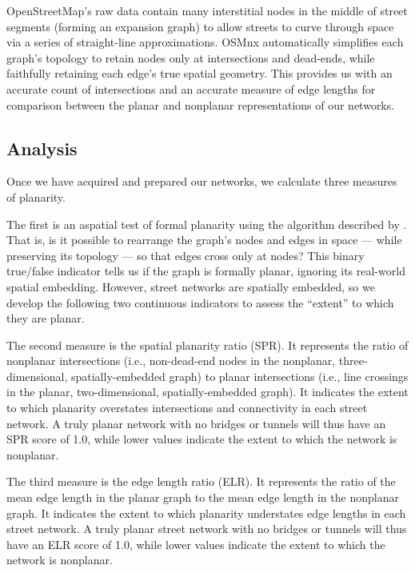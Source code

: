 \documentclass[Afour,sageh,times]{sagej}
\begin{document}
OpenStreetMap's raw data contain many interstitial nodes in the middle of street segments (forming an expansion graph) to allow streets to curve through space via a series of straight-line approximations. OSMnx automatically simplifies each graph's topology to retain nodes only at intersections and dead-ends, while faithfully retaining each edge's true spatial geometry. This provides us with an accurate count of intersections and an accurate measure of edge lengths for comparison between the planar and nonplanar representations of our networks.

\subsection{Analysis}

Once we have acquired and prepared our networks, we calculate three measures of planarity.

The first is an aspatial test of formal planarity using the algorithm described by \citet{boyer_subgraph_2012}. That is, is it possible to rearrange the graph's nodes and edges in space --- while preserving its topology --- so that edges cross only at nodes? This binary true/false indicator tells us if the graph is formally planar, ignoring its real-world spatial embedding. However, street networks are spatially embedded, so we develop the following two continuous indicators to assess the \enquote{extent} to which they are planar.

The second measure is the spatial planarity ratio (SPR). It represents the ratio of nonplanar intersections (i.e., non-dead-end nodes in the nonplanar, three-dimensional, spatially-embedded graph) to planar intersections (i.e., line crossings in the planar, two-dimensional, spatially-embedded graph). It indicates the extent to which planarity overstates intersections and connectivity in each street network. A truly planar network with no bridges or tunnels will thus have an SPR score of 1.0, while lower values indicate the extent to which the network is nonplanar.

The third measure is the edge length ratio (ELR). It represents the ratio of the mean edge length in the planar graph to the mean edge length in the nonplanar graph. It indicates the extent to which planarity understates edge lengths in each street network. A truly planar street network with no bridges or tunnels will thus have an ELR score of 1.0, while lower values indicate the extent to which the network is nonplanar.
\end{document}
